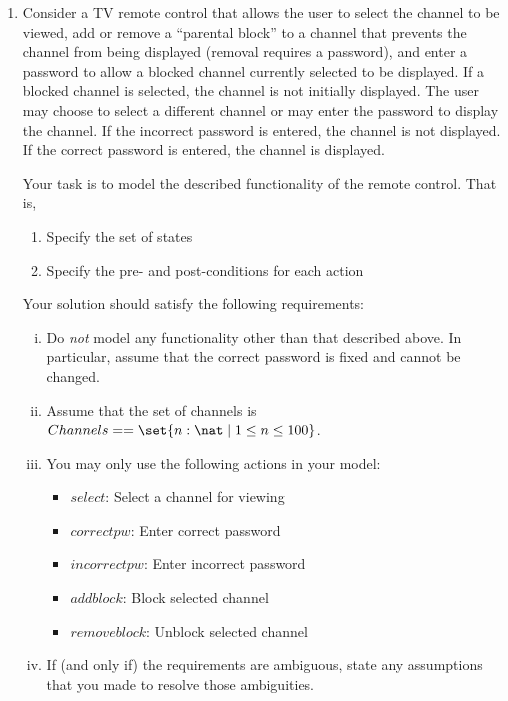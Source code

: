 \documentclass{article}
\begin{document}
\begin{enumerate}
\item Consider a TV remote control that allows the user to select
the channel to be viewed, add or remove a ``parental block'' to a
channel that prevents the channel from being displayed (removal
requires a password), and enter a password to allow a blocked
channel currently selected to be displayed. If a blocked channel
is selected, the channel is not initially displayed. The user may
choose to select a different channel or may enter the password to
display the channel. If the incorrect password is entered, the
channel is not displayed. If the correct password is entered, the
channel is displayed.

Your task is to model the described functionality of the remote control. That is,
\begin{enumerate}
\item Specify the set of states

\item Specify the pre- and post-conditions for each action
\end{enumerate}

Your solution should satisfy the following requirements:
\begin{enumerate}[i.]
\item Do \emph{not} model any functionality other than that described above. In particular, assume that the correct password is fixed and cannot be changed.
\item Assume that the set of channels is $Channels == \set{n:\nat \mid 1 \leq n \leq 100}$.
\item You may only use the following actions in your model:
    \begin{itemize}
    \item $select$: Select a channel for viewing
    \item $correctpw$: Enter correct password
    \item $incorrectpw$: Enter incorrect password
    \item $addblock$: Block selected channel
    \item $removeblock$: Unblock selected channel
    \end{itemize}
\item If (and only if) the requirements are ambiguous, state any assumptions that you made to resolve those ambiguities.
\end{enumerate}


\end{enumerate}
\end{document}

